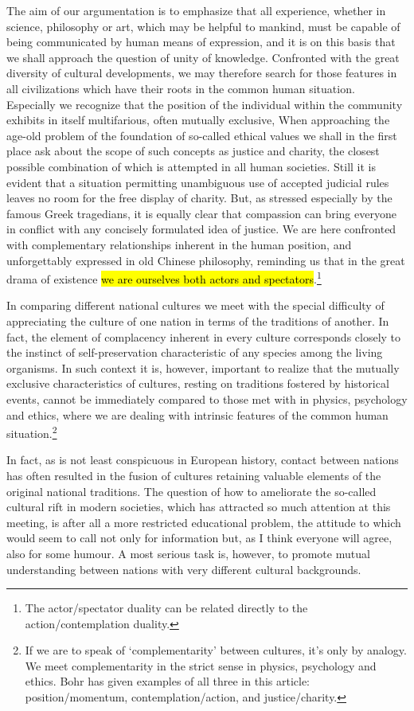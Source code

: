 \documentclass{tufte-handout}
\begin{document}
The aim of our argumentation is to emphasize that all experience,
whether in science, philosophy or art, which may be helpful to
mankind, must be capable of being communicated by human means of
expression, and it is on this basis that we shall approach the
question of unity of knowledge. Confronted with the great diversity of
cultural developments, we may therefore search for those features in
all civilizations which have their roots in the common human
situation.  Especially we recognize that the position of the
individual within the community exhibits in itself multifarious, often
mutually exclusive, When approaching the age-old problem of the
foundation of so-called ethical values we shall in the first place ask
about the scope of such concepts as justice and charity, the closest
possible combination of which is attempted in all human
societies. Still it is evident that a situation permitting unambiguous
use of accepted judicial rules leaves no room for the free display of
charity. But, as stressed especially by the famous Greek tragedians,
it is equally clear that compassion can bring everyone in conflict
with any concisely formulated idea of justice. We are here confronted
with complementary relationships inherent in the human position, and
unforgettably expressed in old Chinese philosophy, reminding us that
in the great drama of existence \hl{we are ourselves both actors and
  spectators}.\footnote{The actor/spectator duality can be related
  directly to the action/contemplation duality.}

In comparing different national cultures we meet with the special
difficulty of appreciating the culture of one nation in terms of the
traditions of another. In fact, the element of complacency inherent in
every culture corresponds closely to the instinct of self-preservation
characteristic of any species among the living organisms. In such
context it is, however, important to realize that the mutually
exclusive characteristics of cultures, resting on traditions fostered
by historical events, cannot be immediately compared to those met with
in physics, psychology and ethics, where we are dealing with intrinsic
features of the common human situation.\footnote{If we are to speak of
  `complementarity' between cultures, it's only by analogy. We meet
  complementarity in the strict sense in physics, psychology and
  ethics. Bohr has given examples of all three in this article:
  position/momentum, contemplation/action, and justice/charity.}

In fact, as is not least conspicuous in European history, contact
between nations has often resulted in the fusion of cultures retaining
valuable elements of the original national traditions. The question of
how to ameliorate the so-called cultural rift in modern societies,
which has attracted so much attention at this meeting, is after all a
more restricted educational problem, the attitude to which would seem
to call not only for information but, as I think everyone will agree,
also for some humour. A most serious task is, however, to promote
mutual understanding between nations with very different cultural
backgrounds.
\end{document}

